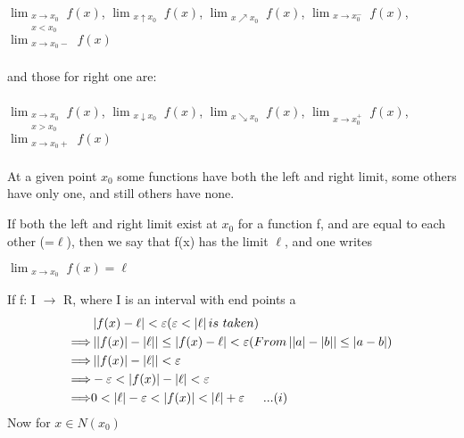 \documentclass[11pt]{amsbook}
\begin{document}
$\lim_{\substack{x\to x_0 \\ x<x_0}}f(x)$, \indent  $\lim_{\substack{x\uparrow x_0}}f(x)$,  \indent $\lim_{\substack{x\nearrow x_0}}f(x)$, \indent $\lim_{\substack{x\to x_0^-}}f(x)$,
\indent $\lim_{\substack{x\to x_0-}}f(x)$ \\\\
and those for right one are:\\\\
$\lim_{\substack{x\to x_0 \\ x>x_0}}f(x)$, \indent  $\lim_{\substack{x\downarrow x_0}}f(x)$,  \indent $\lim_{\substack{x\searrow x_0}}f(x)$, \indent $\lim_{\substack{x\to x_0^+}}f(x)$,
\indent $\lim_{\substack{x\to x_0+}}f(x)$ \\\\


At a given point $x_0$ some functions have both the left and right limit, some others have only one, and still others have none.

If both the left and right limit exist at $x_0$ for a function f, and are equal to each other (=$\ell$), then we say  that f(x) has the limit $\ell$, and one writes
 \begin{center}
$\lim_{\substack{x\to x_0}}f(x) = \ell$
\end{center}
\indent \indent If f: I $\rightarrow$ R, where I is an interval with end points a
\begin{align}
&\left \lvert f(x)- \ell \right \rvert < \varepsilon ( \varepsilon < \left \lvert \ell \right \rvert  is \,\, taken )\\
\Longrightarrow &\left \lvert \left \lvert f(x) \right \rvert - \left \lvert \ell \right \rvert \right \rvert \leq \left \lvert f(x)- \ell \right \rvert < \varepsilon (  From \left \lvert \left \lvert a \right \rvert - \left \lvert b \right \rvert \right \rvert \leq \left \lvert a - b \right \rvert )\\
\Longrightarrow &\left \lvert \left \lvert f(x) \right \rvert - \left \lvert \ell \right \rvert \right \rvert < \varepsilon\\
\Longrightarrow &-\varepsilon < \left \lvert f(x) \right \rvert - \left \lvert \ell \right \rvert < \varepsilon \\
\Longrightarrow &0 <  \left \lvert \ell \right \rvert - \varepsilon < \left \lvert f(x) \right \rvert <  \left \lvert \ell \right \rvert + \varepsilon \indent ...(i)
\end{align}
Now for $x \in N(x_{0})$\\
\end{document}
